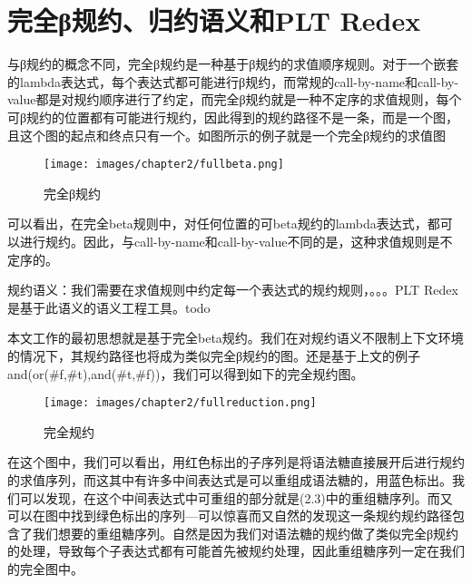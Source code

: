 \section{完全β规约、归约语义和PLT Redex}
与β规约的概念不同，完全β规约是一种基于β规约的求值顺序规则。对于一个嵌套的lambda表达式，每个表达式都可能进行β规约，而常规的call-by-name和call-by-value都是对规约顺序进行了约定，而完全β规约就是一种不定序的求值规则，每个可β规约的位置都有可能进行规约，因此得到的规约路径不是一条，而是一个图，且这个图的起点和终点只有一个。如图所示的例子就是一个完全β规约的求值图

\begin{figure}[h]
	\centering
	\texttt{[image: images/chapter2/fullbeta.png]}
	\caption{完全β规约}
\end{figure}

可以看出，在完全beta规则中，对任何位置的可beta规约的lambda表达式，都可以进行规约。因此，与call-by-name和call-by-value不同的是，这种求值规则是不定序的。


规约语义：我们需要在求值规则中约定每一个表达式的规约规则，。。。PLT Redex是基于此语义的语义工程工具。todo

本文工作的最初思想就是基于完全beta规约。我们在对规约语义不限制上下文环境的情况下，其规约路径也将成为类似完全β规约的图。还是基于上文的例子and(or(\#f,\#t),and(\#t,\#f))，我们可以得到如下的完全规约图。

\begin{figure}[h]
	\centering
	\texttt{[image: images/chapter2/fullreduction.png]}
	\caption{完全规约}
\end{figure}

在这个图中，我们可以看出，用红色标出的子序列是将语法糖直接展开后进行规约的求值序列，而这其中有许多中间表达式是可以重组成语法糖的，用蓝色标出。我们可以发现，在这个中间表达式中可重组的部分就是(2.3)中的重组糖序列。而又可以在图中找到绿色标出的序列---可以惊喜而又自然的发现这一条规约规约路径包含了我们想要的重组糖序列。自然是因为我们对语法糖的规约做了类似完全β规约的处理，导致每个子表达式都有可能首先被规约处理，因此重组糖序列一定在我们的完全图中。

